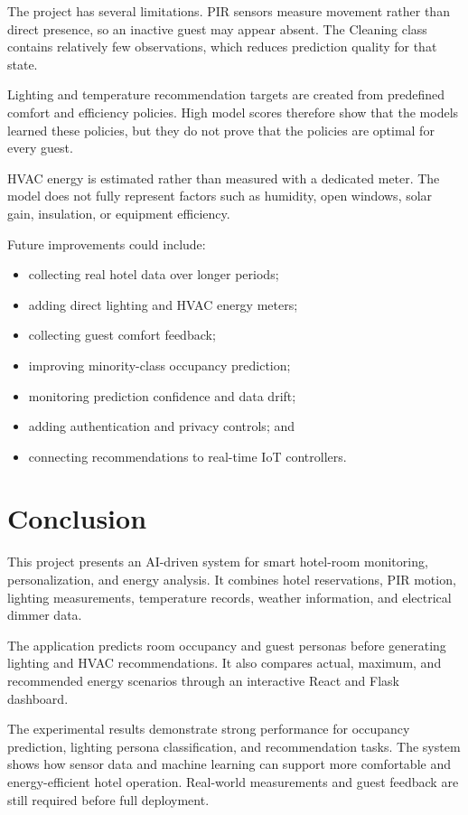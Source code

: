 The project has several limitations. PIR sensors measure movement rather than
direct presence, so an inactive guest may appear absent. The Cleaning class
contains relatively few observations, which reduces prediction quality for
that state.

Lighting and temperature recommendation targets are created from predefined
comfort and efficiency policies. High model scores therefore show that the
models learned these policies, but they do not prove that the policies are
optimal for every guest.

HVAC energy is estimated rather than measured with a dedicated meter. The
model does not fully represent factors such as humidity, open windows, solar
gain, insulation, or equipment efficiency.

Future improvements could include:

\begin{itemize}
    \item collecting real hotel data over longer periods;
    \item adding direct lighting and HVAC energy meters;
    \item collecting guest comfort feedback;
    \item improving minority-class occupancy prediction;
    \item monitoring prediction confidence and data drift;
    \item adding authentication and privacy controls; and
    \item connecting recommendations to real-time IoT controllers.
\end{itemize}


\chapter{Conclusion}
\label{chap:conclusion}

This project presents an AI-driven system for smart hotel-room monitoring,
personalization, and energy analysis. It combines hotel reservations, PIR
motion, lighting measurements, temperature records, weather information, and
electrical dimmer data.

The application predicts room occupancy and guest personas before generating
lighting and HVAC recommendations. It also compares actual, maximum, and
recommended energy scenarios through an interactive React and Flask
dashboard.

The experimental results demonstrate strong performance for occupancy
prediction, lighting persona classification, and recommendation tasks. The
system shows how sensor data and machine learning can support more comfortable
and energy-efficient hotel operation. Real-world measurements and guest
feedback are still required before full deployment.

